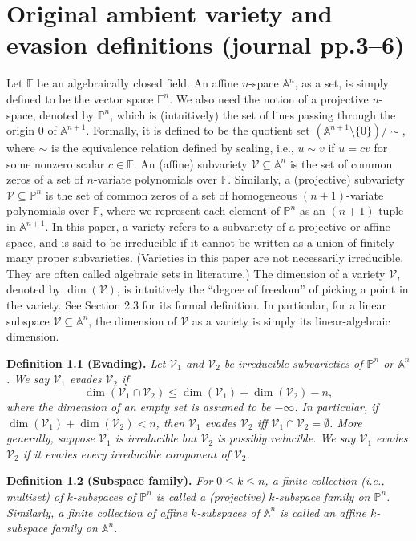 \documentclass[10pt,a4paper]{article}
\newcommand{\FF}{\mathbb F}
\newcommand{\PP}{\mathbb P}
\newcommand{\Aspace}{\mathbb A}
\newenvironment{result}[1]{\par\medskip\noindent\textbf{#1.}\itshape}{\par\medskip}
\begin{document}
\section*{Original ambient variety and evasion definitions (journal pp.3--6)}
Let $\FF$ be an algebraically closed field. An affine $n$-space $\Aspace^n$, as a set, is simply defined to be the vector space $\FF^n$. We also need the notion of a projective $n$-space, denoted by $\PP^n$, which is (intuitively) the set of lines passing through the origin $0$ of $\Aspace^{n+1}$. Formally, it is defined to be the quotient set $(\Aspace^{n+1}\setminus\{0\})/\sim$, where $\sim$ is the equivalence relation defined by scaling, i.e., $u\sim v$ if $u=cv$ for some nonzero scalar $c\in\FF$.
An (affine) subvariety $\mathcal V\subseteq\Aspace^n$ is the set of common zeros of a set of $n$-variate polynomials over $\FF$. Similarly, a (projective) subvariety $\mathcal V\subseteq\PP^n$ is the set of common zeros of a set of homogeneous $(n+1)$-variate polynomials over $\FF$, where we represent each element of $\PP^n$ as an $(n+1)$-tuple in $\Aspace^{n+1}$. In this paper, a variety refers to a subvariety of a projective or affine space, and is said to be irreducible if it cannot be written as a union of finitely many proper subvarieties. (Varieties in this paper are not necessarily irreducible. They are often called algebraic sets in literature.)
The dimension of a variety $\mathcal V$, denoted by $\dim(\mathcal V)$, is intuitively the ``degree of freedom'' of picking a point in the variety. See Section 2.3 for its formal definition. In particular, for a linear subspace $\mathcal V\subseteq\Aspace^n$, the dimension of $\mathcal V$ as a variety is simply its linear-algebraic dimension.
\begin{result}{Definition 1.1 (Evading)}
Let $\mathcal V_1$ and $\mathcal V_2$ be irreducible subvarieties of $\PP^n$ or $\Aspace^n$. We say $\mathcal V_1$ evades $\mathcal V_2$ if
\[\dim(\mathcal V_1\cap\mathcal V_2)\le\dim(\mathcal V_1)+\dim(\mathcal V_2)-n,\]
where the dimension of an empty set is assumed to be $-\infty$. In particular, if $\dim(\mathcal V_1)+\dim(\mathcal V_2)<n$, then $\mathcal V_1$ evades $\mathcal V_2$ iff $\mathcal V_1\cap\mathcal V_2=\emptyset$.
More generally, suppose $\mathcal V_1$ is irreducible but $\mathcal V_2$ is possibly reducible. We say $\mathcal V_1$ evades $\mathcal V_2$ if it evades every irreducible component of $\mathcal V_2$.
\end{result}
\begin{result}{Definition 1.2 (Subspace family)}
For $0\le k\le n$, a finite collection (i.e., multiset) of $k$-subspaces of $\PP^n$ is called a (projective) $k$-subspace family on $\PP^n$. Similarly, a finite collection of affine $k$-subspaces of $\Aspace^n$ is called an affine $k$-subspace family on $\Aspace^n$.
\end{result}
\end{document}
